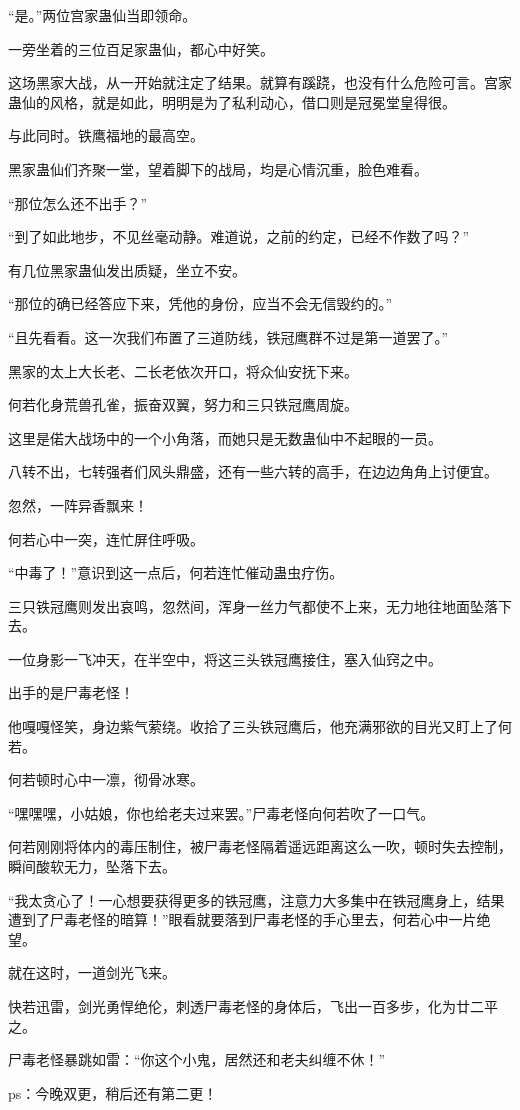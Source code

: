 \begin{this_body}
“是。”两位宫家蛊仙当即领命。

一旁坐着的三位百足家蛊仙，都心中好笑。

这场黑家大战，从一开始就注定了结果。就算有蹊跷，也没有什么危险可言。宫家蛊仙的风格，就是如此，明明是为了私利动心，借口则是冠冕堂皇得很。

与此同时。铁鹰福地的最高空。

黑家蛊仙们齐聚一堂，望着脚下的战局，均是心情沉重，脸色难看。

“那位怎么还不出手？”

“到了如此地步，不见丝毫动静。难道说，之前的约定，已经不作数了吗？”

有几位黑家蛊仙发出质疑，坐立不安。

“那位的确已经答应下来，凭他的身份，应当不会无信毁约的。”

“且先看看。这一次我们布置了三道防线，铁冠鹰群不过是第一道罢了。”

黑家的太上大长老、二长老依次开口，将众仙安抚下来。

何若化身荒兽孔雀，振奋双翼，努力和三只铁冠鹰周旋。

这里是偌大战场中的一个小角落，而她只是无数蛊仙中不起眼的一员。

八转不出，七转强者们风头鼎盛，还有一些六转的高手，在边边角角上讨便宜。

忽然，一阵异香飘来！

何若心中一突，连忙屏住呼吸。

“中毒了！”意识到这一点后，何若连忙催动蛊虫疗伤。

三只铁冠鹰则发出哀鸣，忽然间，浑身一丝力气都使不上来，无力地往地面坠落下去。

一位身影一飞冲天，在半空中，将这三头铁冠鹰接住，塞入仙窍之中。

出手的是尸毒老怪！

他嘎嘎怪笑，身边紫气萦绕。收拾了三头铁冠鹰后，他充满邪欲的目光又盯上了何若。

何若顿时心中一凛，彻骨冰寒。

“嘿嘿嘿，小姑娘，你也给老夫过来罢。”尸毒老怪向何若吹了一口气。

何若刚刚将体内的毒压制住，被尸毒老怪隔着遥远距离这么一吹，顿时失去控制，瞬间酸软无力，坠落下去。

“我太贪心了！一心想要获得更多的铁冠鹰，注意力大多集中在铁冠鹰身上，结果遭到了尸毒老怪的暗算！”眼看就要落到尸毒老怪的手心里去，何若心中一片绝望。

就在这时，一道剑光飞来。

快若迅雷，剑光勇悍绝伦，刺透尸毒老怪的身体后，飞出一百多步，化为廿二平之。

尸毒老怪暴跳如雷：“你这个小鬼，居然还和老夫纠缠不休！”

ps：今晚双更，稍后还有第二更！

\end{this_body}

